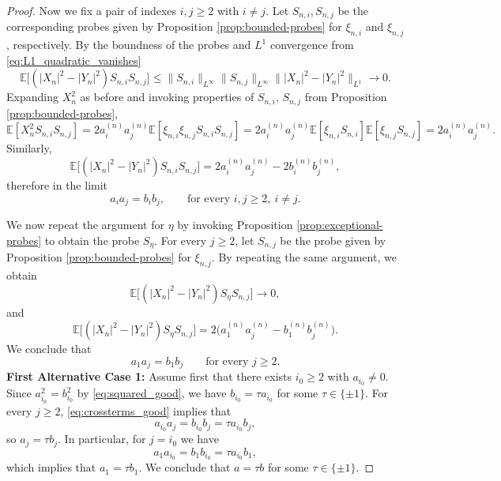 \documentclass[11pt]{amsart}
\newcommand{\E}{\mathbb E}
\begin{document}
\begin{proof}
Now we fix a pair of indexes $i,j \ge 2$ with $i \ne j$. Let $S_{n,i},S_{n,j}$ be the corresponding probes given by
Proposition \ref{prop:bounded-probes} for $\xi_{n,i}$ and $\xi_{n,j}$, respectively.
By the boundness of the probes and $L^1$ convergence from \eqref{eq:L1_quadratic_vanishes}
\[
\E\bigl[(|X_n|^2-|Y_n|^2) S_{n,i} S_{n,j}\bigr] \le \|S_{n,i}\|_{L^{\infty}}\|S_{n,j}\|_{L^{\infty}} \||X_n|^2-|Y_n|^2\|_{L^1}\longrightarrow 0.
\]
Expanding $X_n^2$ as before and invoking properties of $S_{n,i}$, $S_{n,j}$ from Proposition \ref{prop:bounded-probes},
\[
\E[X_n^2 S_{n,i}S_{n,j}] = 2a_i^{(n)}a_j^{(n)}\E[\xi_{n,i}\xi_{n,j}S_{n,i}S_{n,j}] = 2a_i^{(n)}a_j^{(n)}\E[\xi_{n,i}S_{n,i}]\E[\xi_{n,j}S_{n,j}] = 2a_i^{(n)}a_j^{(n)}.
\]
Similarly,
\[
\E\bigl[(|X_n|^2-|Y_n|^2) S_{n,i} S_{n,j}\bigr]
= 2a_i^{(n)}a_j^{(n)} - 2b_i^{(n)}b_j^{(n)},
\]
therefore in the limit
\begin{equation}
\label{eq:crossterms_good}
a_i a_j = b_i b_j, \qquad
\text{for every } i,j \ge 2,\ i \ne j.
\end{equation}


We now repeat the argument for $\eta$ by
invoking Proposition \ref{prop:exceptional-probes} to obtain the probe $S_{\eta}$. For every
$j \ge 2$, let $S_{n,j}$ be the probe given by Proposition
\ref{prop:bounded-probes} for $\xi_{n,j}$. By repeating the same argument, we obtain
\[
\E\bigl[(|X_n|^2-|Y_n|^2) S_\eta S_{n,j}\bigr] \longrightarrow 0,
\]
and
\[
\E\bigl[(|X_n|^2-|Y_n|^2) S_\eta S_{n,j}\bigr]
=
2\bigl(a_1^{(n)} a_j^{(n)} - b_1^{(n)} b_j^{(n)}\bigr).
\]
We conclude that
\[
a_1 a_j = b_1 b_j
\qquad
\text{for every } j \ge 2.
\]
\textbf{First Alternative Case 1:}
Assume first that there exists $i_0 \ge 2$ with $a_{i_0} \ne 0$. Since
$a_{i_0}^2=b_{i_0}^2$ by \eqref{eq:squared_good}, we have $b_{i_0} = \tau a_{i_0}$ for some
$\tau \in \{\pm 1\}$. For every $j \ge 2$, \eqref{eq:crossterms_good} implies that
\[
a_{i_0} a_j = b_{i_0} b_j = \tau a_{i_0} b_j,
\]
so $a_j = \tau b_j$. In particular, for  $j=i_0$ we have
\[
a_1 a_{i_0} = b_1 b_{i_0} = \tau a_{i_0} b_1,
\]
which implies that $a_1 = \tau b_1$. We conclude that $a=\tau b$ for some $\tau \in \{\pm 1\}$.


\end{proof}
\end{document}
